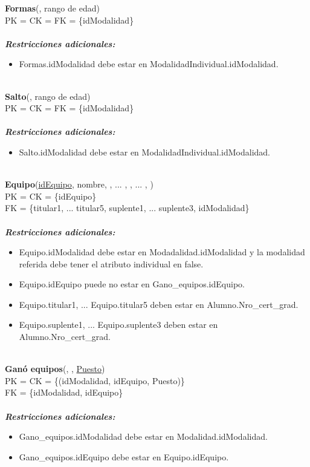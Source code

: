 \noindent
\textbf{Formas}(, rango de edad)\\
PK = CK = FK = \{idModalidad\}\\\\
\textbf{\textit{Restricciones adicionales:}}
\begin{itemize}
    \item Formas.idModalidad debe estar en ModalidadIndividual.idModalidad.
\end{itemize}\\

\noindent
\textbf{Salto}(, rango de edad)\\
PK = CK = FK = \{idModalidad\}\\\\
\textbf{\textit{Restricciones adicionales:}}
\begin{itemize}
    \item Salto.idModalidad debe estar en ModalidadIndividual.idModalidad.
\end{itemize}\\

\noindent
\textbf{Equipo}(\underline{idEquipo}, nombre, , ... , , ... , )\\
PK = CK = \{idEquipo\}\\
FK = \{titular1, ... titular5, suplente1, ... suplente3, idModalidad\}\\\\
\textbf{\textit{Restricciones adicionales:}}
\begin{itemize}
    \item Equipo.idModalidad debe estar en Modadalidad.idModalidad y la modalidad referida debe tener el atributo individual en false.
    \item Equipo.idEquipo puede no estar en Gano\_equipos.idEquipo.
    \item Equipo.titular1, ... Equipo.titular5 deben estar en Alumno.Nro\_cert\_grad.
    \item Equipo.suplente1, ... Equipo.suplente3 deben estar en Alumno.Nro\_cert\_grad.
\end{itemize}\\

\noindent
\textbf{Ganó equipos}(, , \underline{Puesto})\\
PK = CK = \{(idModalidad, idEquipo, Puesto)\}\\
FK = \{idModalidad, idEquipo\}\\\\
\textbf{\textit{Restricciones adicionales:}}
\begin{itemize}
    \item Gano\_equipos.idModalidad debe estar en Modalidad.idModalidad.
    \item Gano\_equipos.idEquipo debe estar en Equipo.idEquipo.
\end{itemize}\\

